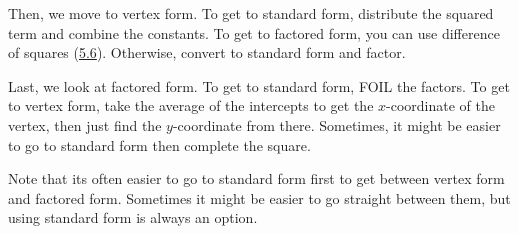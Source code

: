 \documentclass[../book.tex]{subfiles}
\begin{document}
Then, we move to vertex form.  To get to standard form, distribute the squared term and combine the constants.  To get to factored form, you can use difference of squares (\hyperlink{section.5.6}{5.6}).  Otherwise, convert to standard form and factor.

Last, we look at factored form.  To get to standard form, FOIL the factors.  To get to vertex form, take the average of the intercepts to get the $x$-coordinate of the vertex, then just find the $y$-coordinate from there.  Sometimes, it might be easier to go to standard form then complete the square.

Note that its often easier to go to standard form first to get between vertex form and factored form.  Sometimes it might be easier to go straight between them, but using standard form is always an option.
\end{document}
